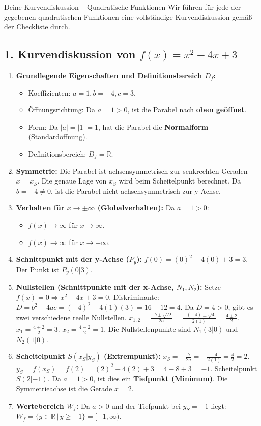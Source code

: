 \begin{loesungsumgebung}{Deine Kurvendiskussion – Quadratische Funktionen}
Wir führen für jede der gegebenen quadratischen Funktionen eine vollständige Kurvendiskussion gemäß der Checkliste durch.

\subsection*{1. Kurvendiskussion von $f(x) = x^2 - 4x + 3$}
\begin{enumerate}[label=(\alph*)]
    \item \textbf{Grundlegende Eigenschaften und Definitionsbereich $D_f$:}
    \begin{itemize}
        \item Koeffizienten: $a=1, b=-4, c=3$.
        \item Öffnungsrichtung: Da $a=1 > 0$, ist die Parabel nach \textbf{oben geöffnet}.
        \item Form: Da $|a|=|1|=1$, hat die Parabel die \textbf{Normalform} (Standardöffnung).
        \item Definitionsbereich: $D_f = \mathbb{R}$.
    \end{itemize}
    \item \textbf{Symmetrie:}
    Die Parabel ist achsensymmetrisch zur senkrechten Geraden $x = x_S$. Die genaue Lage von $x_S$ wird beim Scheitelpunkt berechnet. Da $b=-4 \neq 0$, ist die Parabel nicht achsensymmetrisch zur y-Achse.
    \item \textbf{Verhalten für $x \to \pm \infty$ (Globalverhalten):}
    Da $a=1 > 0$:
    \begin{itemize}
        \item $f(x) \to \infty$ für $x \to \infty$.
        \item $f(x) \to \infty$ für $x \to -\infty$.
    \end{itemize}
    \item \textbf{Schnittpunkt mit der y-Achse ($P_y$):}
    $f(0) = (0)^2 - 4(0) + 3 = 3$. Der Punkt ist $P_y(0|3)$.
    \item \textbf{Nullstellen (Schnittpunkte mit der x-Achse, $N_1, N_2$):}
    Setze $f(x)=0 \Rightarrow x^2 - 4x + 3 = 0$.
    Diskriminante: $D = b^2 - 4ac = (-4)^2 - 4(1)(3) = 16 - 12 = 4$.
    Da $D=4 > 0$, gibt es zwei verschiedene reelle Nullstellen.
    $x_{1,2} = \frac{-b \pm \sqrt{D}}{2a} = \frac{-(-4) \pm \sqrt{4}}{2(1)} = \frac{4 \pm 2}{2}$.
    $x_1 = \frac{4+2}{2} = 3$.
    $x_2 = \frac{4-2}{2} = 1$.
    Die Nullstellenpunkte sind $N_1(3|0)$ und $N_2(1|0)$.
    \item \textbf{Scheitelpunkt $S(x_S|y_S)$ (Extrempunkt):}
    $x_S = -\frac{b}{2a} = -\frac{-4}{2(1)} = \frac{4}{2} = 2$.
    $y_S = f(x_S) = f(2) = (2)^2 - 4(2) + 3 = 4 - 8 + 3 = -1$.
    Scheitelpunkt $S(2|-1)$. Da $a=1 > 0$, ist dies ein \textbf{Tiefpunkt (Minimum)}.
    Die Symmetrieachse ist die Gerade $x=2$.
    \item \textbf{Wertebereich $W_f$:}
    Da $a>0$ und der Tiefpunkt bei $y_S=-1$ liegt: $W_f = \{ y \in \mathbb{R} \,|\, y \ge -1 \} = [-1, \infty)$.
\end{enumerate}


\end{loesungsumgebung}
